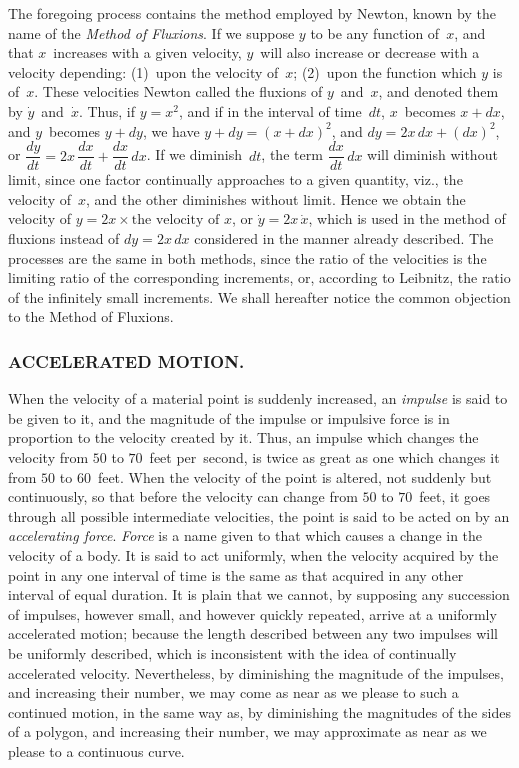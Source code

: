 \documentclass[12pt]{book}[2005/09/16]
\newcommand{\Typo}[2]{#2}
\newlength{\TmpLen}
\newcommand{\ToCAnchor}{}
\newcommand{\ToCLine}[2]{%
  \label{toc:#1}%
  \ifthenelse{\not\equal{\pageref{toc:#1}}{\ToCAnchor}}{%
    \renewcommand{\ToCAnchor}{\pageref{toc:#1}}%
    \noindent\makebox[\textwidth][r]{\scriptsize \hfill PAGE}\\
  }{}%
  \settowidth{\TmpLen}{999}%
  \noindent\strut\parbox[b]{\textwidth-\TmpLen}{\small%
     \hangindent2em#2\dotfill}%
  \makebox[\TmpLen][r]{\pageref{section:#1}}%
  \smallskip
}
\newcounter{SecNo}
\newcommand{\SubSectHead}[1]{
  \subsubsection*{\centering\footnotesize\normalfont\MakeUppercase{#1}}
}
\newcommand{\Subsection}[2][]{
  \SubSectHead{#2}
  \refstepcounter{SecNo}
  \label{section:\theSecNo}%
  \ifthenelse{\equal{#1}{}}{%
    \addtocontents{toc}{\protect\ToCLine{\theSecNo}{#2}}%
  }{%
    \addtocontents{toc}{\protect\ToCLine{\theSecNo}{#1}}%
  }
}
\newcommand{\Pagelabel}[1]{\phantomsection\label{page:#1}}
\newcommand{\PageSep}[1]{\Pagelabel{#1}\ignorespaces}
\renewcommand{\(}{{\upshape(}}
\renewcommand{\)}{{\upshape)}}
\begin{document}
The foregoing process contains the method employed
%
by Newton, known by the name of the \emph{Method
%
of Fluxions}. If we suppose $y$ to be any function of~$x$,
and that $x$~increases with a given velocity, $y$~will also
increase or decrease with a velocity depending: (1)~upon
the velocity of~$x$; (2)~upon the function which
$y$ is of~$x$. These velocities Newton called the fluxions
of $y$~and~$x$, and denoted them by $\dot{y}$~and~$\dot{x}$. Thus, if
$y = x^{2}$, and if in the interval of time~$dt$, $x$~becomes
$x + dx$, and $y$~becomes $y + dy$, we have $y + dy = (x + dx)^{2}$,
and $dy = 2x\, dx + (dx)^{2}$, or $\dfrac{dy}{dt} = 2x\, \dfrac{dx}{dt} + \dfrac{dx}{dt}\, dx$.
If we diminish~$dt$, the term $\dfrac{dx}{dt}\, dx$ will diminish
without limit, since one factor continually approaches
to a given quantity, viz., the velocity of~$x$,
and the other diminishes without limit. Hence we
obtain the velocity of $y = 2x × \text{the velocity of~$x$}$, or
$\dot{y} = 2x\, \dot{x}$, which is used in the method of fluxions instead
of $dy = 2x\, dx$ considered in the manner already
described. The processes are the same in both methods,
since the ratio of the velocities is the limiting
ratio of the corresponding increments, or, according
to Leibnitz, the ratio of the infinitely small increments.
%
We shall hereafter notice the common objection
to the Method of Fluxions.


\Subsection{Accelerated Motion.}

When the velocity of a material point is suddenly
%
%
%
increased, an \emph{impulse} is said to be given to it, and the
%
\PageSep{61}
magnitude of the impulse or impulsive force is in proportion
%
to the velocity created by it. Thus, an impulse
which changes the velocity from $50$ to $70$~feet
per~second, is twice as great as one which changes it
from $50$ to $60$~feet. When the velocity of the point is
altered, not suddenly but continuously, so that before
the velocity can change from $50$ to $70$~feet, it goes
through all possible intermediate velocities, the point
is said to be acted on by an \emph{accelerating force}. \emph{Force}
is a name given to that which causes a change in the
velocity of a body. It is said to act uniformly, when
the velocity acquired by the point in any one interval
of time is the same as that acquired in any other interval
of equal duration. It is plain that we cannot,
by supposing any succession of impulses, however
small, and however quickly repeated, arrive at a uniformly
accelerated motion; because the length described
between any two impulses will be uniformly
described, which is inconsistent with the idea of continually
accelerated velocity. Nevertheless, by diminishing
the magnitude of the impulses, and increasing
their number, we may come as near as we please
to such a continued motion, in the same way as, by
diminishing the magnitudes of the sides of a polygon,
and increasing their number, we may approximate as
near as we please to a \Typo{continous}{continuous} curve.
\end{document}
